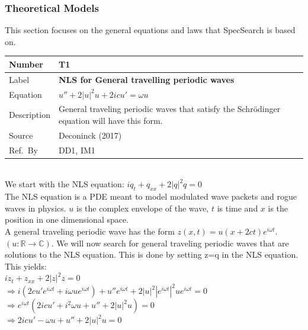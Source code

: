 \documentclass[12pt]{article}
\newcommand{\colAwidth}{0.13\textwidth}
\newcommand{\colBwidth}{0.82\textwidth}
\begin{document}
\subsubsection{Theoretical Models}\label{sec_theoretical}

This section focuses on the general equations and laws that SpecSearch is based
on. 
~\newline

\noindent
\begin{minipage}{\textwidth}
	\renewcommand*{\arraystretch}{1.5}
	\begin{tabular}{| p{\colAwidth} | p{\colBwidth}|}
		\hline
		\rowcolor[gray]{0.9}
		Number& T1\\
		\hline
		Label&\bf NLS for General travelling periodic waves\\
		\hline
		Equation&  $ u'' + 2|u|^{2}u+2icu'=\omega u$\\
		\hline
		Description & 
		General traveling periodic waves that satisfy the Schr\"{o}dinger 
		equation 
		will have this form. \\
		\hline
		Source &
		Deconinck (2017)\\
		\hline
		Ref.\ By & DD1, IM1\\
		\hline
	\end{tabular}
\end{minipage}\\ 

We start with the NLS equation: $iq_{t} + q_{xx} + 
2|q|^{2}q=0$ \\ 

The NLS equation is a PDE meant to model modulated wave packets and rogue waves 
in physics. $u$ is the complex envelope of the wave, $t$ is time and $x$ is the 
position in one dimensional space. \\ 

A general traveling periodic wave has the form $z(x,t)=u(x+2ct)e^{i \omega 
t}$.$(u: \mathbb{R} \rightarrow \mathbb{C})$. 
We will now search for general traveling periodic waves that are solutions to 
the NLS equation. This is done by setting z=q in the NLS equation. This 
yields: \\ 

$ iz_{t} + z_{xx} + 2|z|^{2}z = 0$ \\ 
$ \Rightarrow i(2cu'e^{i \omega t} + i \omega ue^{i \omega t}) + u''e^{i \omega 
t} + 2|u|^{2}|e^{i \omega t}|^{2} u e^{i \omega t} = 0 $ \\
 $\Rightarrow e^{i \omega t} (2icu' + i^{2} \omega u + u'' + 2|u|^{2}u) = 0 $ 
 \\ 
$ \Rightarrow 2icu' - \omega u + u'' + 2|u|^{2}u =0$ \\ 
\end{document}
